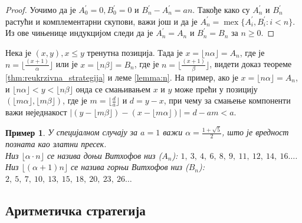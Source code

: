 \documentclass[a4paper]{article}
\newtheorem{example}{Пример}
\DeclareMathOperator{\mex}{mex}
\begin{document}
\begin{proof}
	Уочимо да је $ A^{'}_{0} = 0, B^{'}_{0} = 0 $ и $ B^{'}_{n} - A^{'}_{n} = an $. Такође како су $ A^{'}_{n} $ и $ B^{'}_{n} $ растући и комплементарни скупови, важи још и да је $ A^{'}_{n} = \mex \{ A^{'}_{i}, B^{'}_{i} : i < n \} $. Из ове чињенице индукцијом следи да је $ A^{'}_{n} = A_{n} $ и $ B^{'}_{n} = B_{n}  $ за $ n \ge 0 $.
\end{proof}

Нека је $ (x, y), x \leq y $ тренутна позиција. Тада је $ x = \lfloor n \alpha \rfloor = A_{n} $, где је $ n = \lfloor \frac{(x+1)}{\alpha} \rfloor $ или је $ x = \lfloor n \beta \rfloor = B_{n} $, где је $ n = \lfloor \frac{(x+1)}{\beta} \rfloor $, видети доказ теореме \ref{thm:reukrzivna_strategija} и леме \ref{lemma:n}. На пример, ако је $ x = \lfloor n \alpha \rfloor = A_{n} $, и $ \lfloor n \alpha \rfloor < y < \lfloor n \beta \rfloor $ онда се смањивањем $ x $ и $ y $ може прећи у позицију $ (\lfloor m \alpha \rfloor, \lfloor m \beta \rfloor) $, где је $ m = \lfloor \frac{d}{a} \rfloor $ и $ d = y - x $, при чему за смањење компоненти важи неједнакост $ |(y - \lfloor m \beta \rfloor) - (x - \lfloor m \alpha \rfloor)| = d - am < a $.

\begin{example}
	У специјалном случају за $ a = 1 $ важи $ \alpha = \frac{1 + \sqrt{5}}{2} $, што је вредност позната као златни пресек.\\	
	Низ $ \lfloor \alpha \cdot n \rfloor $ се назива доњи Витхофов низ ($ A_{n} $):
	$ 1,\ 3,\ 4,\ 6,\ 8,\ 9,\ 11,\ 12,\ 14,\ 16 \ldots $. Низ $ \lfloor (\alpha + 1) n \rfloor $ се назива горњи Витхофов низ ($ B_{n} $):
	$ 2,\ 5,\ 7,\ 10,\ 13,\ 15,\ 18,\ 20,\ 23,\ 26 \ldots $
\end{example}

\subsection{Аритметичка стратегија}
\end{document}
